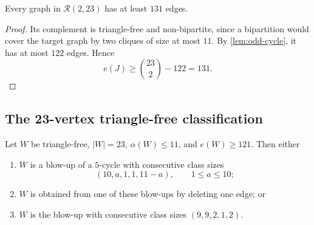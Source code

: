 \begin{corollary}
Every graph in $\mathcal R(2,23)$ has at least $131$ edges.
\end{corollary}

\begin{proof}
Its complement is triangle-free and non-bipartite, since a bipartition would cover the target graph by two cliques of size at most $11$. By \cref{lem:odd-cycle}, it has at most $122$ edges. Hence
\[
e(J)\geq\binom{23}{2}-122=131.
\]
\end{proof}

\subsection{The 23-vertex triangle-free classification}

\begin{lemma}
\label{lem:TF23}
Let $W$ be triangle-free, $|W|=23$, $\alpha(W)\leq11$, and $e(W)\geq121$. Then either
\begin{enumerate}
\item $W$ is a blow-up of a $5$-cycle with consecutive class sizes
\[
(10,a,1,1,11-a),\qquad 1\leq a\leq10;
\]
\item $W$ is obtained from one of these blow-ups by deleting one edge; or
\item $W$ is the blow-up with consecutive class sizes $(9,9,2,1,2)$.
\end{enumerate}
\end{lemma}

